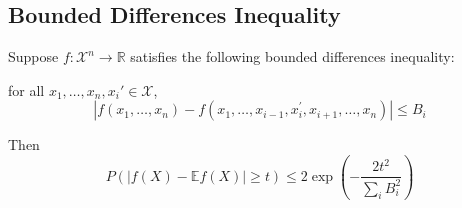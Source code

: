 \subsection{Bounded Differences Inequality}

\begin{theorem} \cite*{Sridharan_agentle}
  Suppose $f: \mathcal{X}^n \rightarrow \mathbb{R}$ satisfies the following bounded differences inequality:

  for all $x_1, \dots, x_n , x_{i}' \in \mathcal{X}$,
  \begin{equation}
    \left|f\left(x_{1}, \ldots, x_{n}\right)-f\left(x_{1}, \ldots, x_{i-1}, x_{i}^{\prime}, x_{i+1}, \ldots, x_{n}\right)\right| \leq B_{i}
  \end{equation}

  Then
  \begin{equation}
    P(|f(X)-\mathbb{E} f(X)| \geq t) \leq 2 \exp \left(-\frac{2 t^{2}}{\sum_{i} B_{i}^{2}}\right)
  \end{equation}
\end{theorem}

